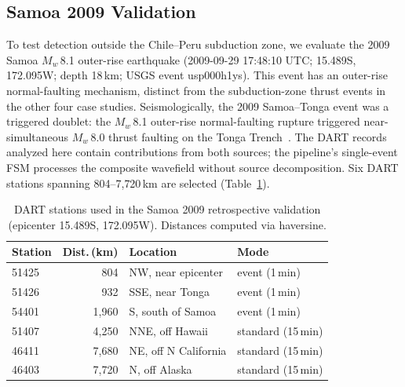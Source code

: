 \documentclass{article}
\begin{document}
\FloatBarrier
\subsection{Samoa 2009 Validation}
\label{sec:eval-samoa}

To test detection outside the Chile--Peru subduction zone,
we evaluate the 2009 Samoa $M_w$\,8.1 outer-rise earthquake
(2009-09-29 17:48:10 UTC; 15.489\textdegree S, 172.095\textdegree W;
depth 18\,km; USGS event usp000h1ys).
This event has an outer-rise normal-faulting mechanism,
distinct from the subduction-zone thrust events in the other four case
studies.  Seismologically, the 2009 Samoa--Tonga event was a triggered
doublet: the $M_w$\,8.1 outer-rise normal-faulting rupture triggered
near-simultaneous $M_w$\,8.0 thrust faulting on the Tonga
Trench~\citep{lay2010samoa}.  The DART records analyzed here contain
contributions from both sources; the pipeline's single-event FSM
processes the composite wavefield without source decomposition.
Six DART stations spanning 804--7{,}720\,km are selected
(Table~\ref{tab:samoa-stations}).

\begin{table}[!htb]
\centering
\caption{DART stations used in the Samoa 2009 retrospective validation
  (epicenter 15.489\textdegree{}S, 172.095\textdegree{}W).
  Distances computed via haversine.}
\label{tab:samoa-stations}
\small
\begin{tabular}{lrll}
\toprule
\textbf{Station} & \textbf{Dist.\,(km)} & \textbf{Location} & \textbf{Mode} \\
\midrule
51425 &    804  & NW, near epicenter     & event (1\,min) \\
51426 &    932  & SSE, near Tonga         & event (1\,min) \\
54401 & 1{,}960 & S, south of Samoa       & event (1\,min) \\
51407 & 4{,}250 & NNE, off Hawaii          & standard (15\,min) \\
46411 & 7{,}680 & NE, off N California    & standard (15\,min) \\
46403 & 7{,}720 & N, off Alaska          & standard (15\,min) \\
\bottomrule
\end{tabular}
\end{table}
\end{document}
